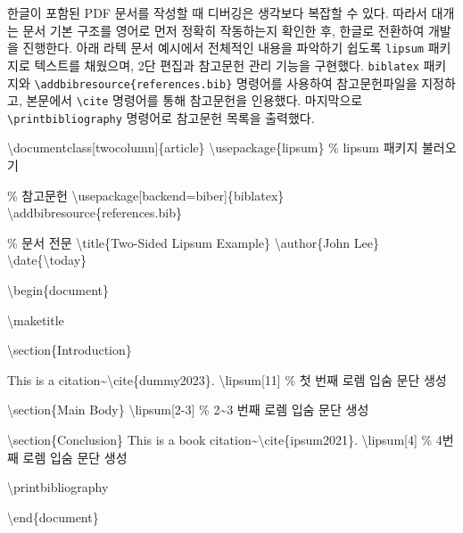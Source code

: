 \documentclass[
  letterpaper,
]{book}
\newenvironment{Shaded}{\begin{snugshade}}{\end{snugshade}}
\newcommand{\BuiltInTok}[1]{\textcolor[rgb]{0.00,0.23,0.31}{#1}}
\newcommand{\CommentTok}[1]{\textcolor[rgb]{0.37,0.37,0.37}{#1}}
\newcommand{\ExtensionTok}[1]{\textcolor[rgb]{0.00,0.23,0.31}{#1}}
\newcommand{\FunctionTok}[1]{\textcolor[rgb]{0.28,0.35,0.67}{#1}}
\newcommand{\KeywordTok}[1]{\textcolor[rgb]{0.00,0.23,0.31}{#1}}
\newcommand{\NormalTok}[1]{\textcolor[rgb]{0.00,0.23,0.31}{#1}}
\begin{document}
한글이 포함된 PDF 문서를 작성할 때 디버깅은 생각보다 복잡할 수 있다.
따라서 대개는 문서 기본 구조를 영어로 먼저 정확히 작동하는지 확인한 후,
한글로 전환하여 개발을 진행한다. 아래 라텍 문서 예시에서 전체적인 내용을
파악하기 쉽도록 \texttt{lipsum} 패키지로 텍스트를 채웠으며, 2단 편집과
참고문헌 관리 기능을 구현했다. \texttt{biblatex} 패키지와
\texttt{\textbackslash{}addbibresource\{references.bib\}} 명령어를
사용하여 참고문헌파일을 지정하고, 본문에서 \texttt{\textbackslash{}cite}
명령어를 통해 참고문헌을 인용했다. 마지막으로
\texttt{\textbackslash{}printbibliography} 명령어로 참고문헌 목록을
출력했다.

\begin{Shaded}
\begin{Highlighting}[]
\BuiltInTok{\textbackslash{}documentclass}\NormalTok{[twocolumn]\{}\ExtensionTok{article}\NormalTok{\}}
\BuiltInTok{\textbackslash{}usepackage}\NormalTok{\{}\ExtensionTok{lipsum}\NormalTok{\} }\CommentTok{\% lipsum 패키지 불러오기}

\CommentTok{\% 참고문헌}
\BuiltInTok{\textbackslash{}usepackage}\NormalTok{[backend=biber]\{}\ExtensionTok{biblatex}\NormalTok{\}}
\FunctionTok{\textbackslash{}addbibresource}\NormalTok{\{references.bib\}}

\CommentTok{\% 문서 전문}
\FunctionTok{\textbackslash{}title}\NormalTok{\{Two{-}Sided Lipsum Example\}}
\FunctionTok{\textbackslash{}author}\NormalTok{\{John Lee\}}
\FunctionTok{\textbackslash{}date}\NormalTok{\{}\FunctionTok{\textbackslash{}today}\NormalTok{\}}


\KeywordTok{\textbackslash{}begin}\NormalTok{\{}\ExtensionTok{document}\NormalTok{\}    }
    
    \FunctionTok{\textbackslash{}maketitle}
    
    \KeywordTok{\textbackslash{}section}\NormalTok{\{Introduction\}}
    
\NormalTok{    This is a citation\textasciitilde{}}\KeywordTok{\textbackslash{}cite}\NormalTok{\{}\ExtensionTok{dummy2023}\NormalTok{\}.}
    \FunctionTok{\textbackslash{}lipsum}\NormalTok{[11] }\CommentTok{\% 첫 번째 로렘 입숨 문단 생성  }
    
    \KeywordTok{\textbackslash{}section}\NormalTok{\{Main Body\}}
    \FunctionTok{\textbackslash{}lipsum}\NormalTok{[2{-}3] }\CommentTok{\% 2\textasciitilde{}3 번째 로렘 입숨 문단 생성}
    
    \KeywordTok{\textbackslash{}section}\NormalTok{\{Conclusion\}}
\NormalTok{    This is a book citation\textasciitilde{}}\KeywordTok{\textbackslash{}cite}\NormalTok{\{}\ExtensionTok{ipsum2021}\NormalTok{\}.}
    \FunctionTok{\textbackslash{}lipsum}\NormalTok{[4] }\CommentTok{\% 4번째 로렘 입숨 문단 생성}

\FunctionTok{\textbackslash{}printbibliography}
    
\KeywordTok{\textbackslash{}end}\NormalTok{\{}\ExtensionTok{document}\NormalTok{\}}
\end{Highlighting}
\end{Shaded}
\end{document}
